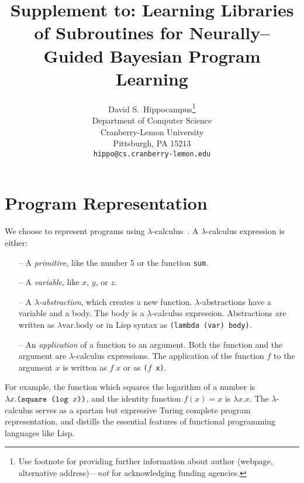 \documentclass{article}
\title{Supplement to: Learning Libraries of Subroutines for Neurally--Guided Bayesian Program Learning}
\author{
  David S.~Hippocampus\thanks{Use footnote for providing further
    information about author (webpage, alternative
    address)---\emph{not} for acknowledging funding agencies.} \\
  Department of Computer Science\\
  Cranberry-Lemon University\\
  Pittsburgh, PA 15213 \\
  \texttt{hippo@cs.cranberry-lemon.edu} \\
}
\begin{document}

\maketitle



\section{Program Representation}\label{programrepresentation}
We choose to represent programs using $\lambda$-calculus~\cite{pierce}.
A $\lambda$-calculus expression is either:
\begin{itemize}
  \item[--] A \emph{primitive}, like the number 5 or the function \texttt{sum}.
  \item[--] A \emph{variable}, like $x$, $y$, or $z$.
  \item[--] A $\lambda$\emph{-abstraction}, which creates a new function.  $\lambda$-abstractions have a variable and a body. The body is a $\lambda$-calculus expression. Abstractions are written as $\lambda \text{var}. \text{body}$ or in Lisp syntax as \mbox{\texttt{(lambda (\textrm{var}) \textrm{body})}}.
  \item[--] An \emph{application} of a function to an argument. Both the function and the argument are $\lambda$-calculus expressions. The application of the function $f$ to the argument $x$ is written as $f\; x$ or as \texttt{($f$ x)}.
\end{itemize}

For example, the function which squares the logarithm of a number is
$\lambda x.\text{\tt(square (log $x$))}$, and the identity function $f(x) = x$ is $\lambda x.x$. The
$\lambda$-calculus serves as a spartan but expressive Turing complete
program representation, and distills the essential features of functional
programming languages like Lisp.
\end{document}
